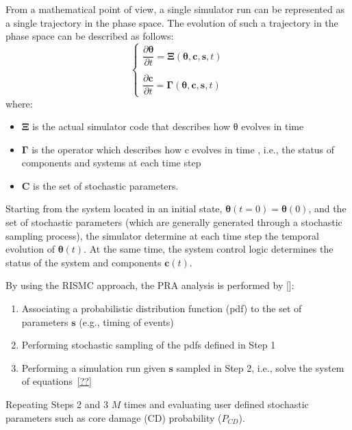 From a mathematical point of view, a single simulator run can be represented as a single trajectory in the 
phase space. The evolution of such a trajectory in the phase space can be described as follows:
\begin{equation}
  \begin{cases}
    \dfrac{\partial \boldsymbol \theta }{\partial t}  = \boldsymbol \Xi (\boldsymbol \theta , \boldsymbol c, \boldsymbol s , t)   \\ \\ 
    \dfrac{\partial \boldsymbol c }{\partial t}  = \boldsymbol \Gamma (\boldsymbol \theta , \boldsymbol c, \boldsymbol s , t) 
  \end{cases}    
  \label{eq:trajectory}
\end{equation}
where:
\begin{itemize}
  \item $\boldsymbol \Xi$ is the actual simulator code that describes how θ evolves in time
  \item $\boldsymbol \Gamma$ is the operator which describes how c evolves in time , i.e., the status 
        of components and systems at each time step
  \item $\boldsymbol C$ is the set of stochastic parameters.
\end{itemize}

Starting from the system located in an initial state, $\boldsymbol \theta (t=0) = \boldsymbol \theta(0)$, 
and the set of stochastic parameters (which are generally generated through a stochastic sampling process), 
the simulator determine at each 
time step the temporal evolution of $\boldsymbol \theta (t)$. At the same time, the system control logic  determines the status 
of the system and components $\boldsymbol c(t)$.
 
By using the RISMC approach, the PRA analysis is performed by []:
\begin{enumerate}
  \item Associating a probabilistic distribution function (pdf) to the set of parameters $\boldsymbol s$ (e.g., timing of events)
  \item Performing stochastic sampling of the pdfs defined in Step 1
  \item Performing a simulation run given $\boldsymbol s$ sampled in Step 2, i.e., solve the system of equations~\ref{??}
\end{enumerate}

Repeating Steps 2 and 3 $M$ times and evaluating user defined stochastic parameters such as core damage (CD) 
probability ($P_{CD}$).
